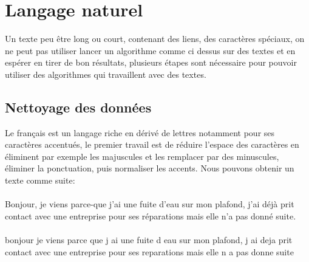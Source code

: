 \section{Langage naturel}

Un texte peu être long ou court, contenant des liens, des caractères spéciaux, on ne peut pas utiliser lancer un algorithme comme ci dessus sur des textes et en espérer en tirer de bon résultats, plusieurs étapes sont nécessaire pour pouvoir utiliser des algorithmes qui travaillent avec des textes. 

\subsection{Nettoyage des données}

Le français est un langage riche en dérivé de lettres notamment pour ses caractères accentués, le premier travail est de réduire l'espace des caractères en éliminent par exemple les majuscules et les remplacer par des minuscules, éliminer la ponctuation, puis normaliser les accents. Nous pouvons obtenir un texte comme suite:
\\
\sepline\\
Bonjour, je viens parce-que j'ai une fuite d'eau sur mon plafond, j'ai déjà prit contact avec une entreprise pour ses réparations mais elle n'a pas donné suite.\\
\sepline\\
bonjour je viens parce que j ai une fuite d eau sur mon plafond, j ai deja prit contact avec une entreprise pour ses reparations mais elle n a pas donne suite\\
\sepline\\

